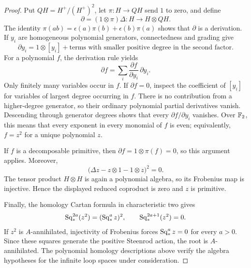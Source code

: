 \begin{proof}
Put $QH=H^+/(H^+)^2$, let $\pi:H\to QH$ send $1$ to zero,
and define
\[
 \partial=(1\otimes\pi)\Delta:H\longrightarrow H\otimes QH.
\]
The identity
$\pi(ab)=\epsilon(a)\pi(b)+\epsilon(b)\pi(a)$ shows that
$\partial$ is a derivation. If $y_i$ are homogeneous polynomial
generators, connectedness and grading give
\[
 \partial y_i=1\otimes[y_i]
  +\text{terms with smaller positive degree in the second factor}.
\]
For a polynomial $f$, the derivation rule yields
\[
 \partial f=\sum_i\frac{\partial f}{\partial y_i}\,\partial y_i.
\]
Only finitely many variables occur in $f$. If $\partial f=0$,
inspect the coefficient of $[y_i]$ for variables of largest
degree occurring in $f$. There is no contribution from a
higher-degree generator, so their ordinary polynomial partial
derivatives vanish. Descending through generator degrees shows
that every $\partial f/\partial y_i$ vanishes. Over $\mathbb F_2$, this
means that every exponent in every monomial of $f$ is even;
equivalently, $f=z^2$ for a unique polynomial $z$.

If $f$ is a decomposable primitive, then
$\partial f=1\otimes\pi(f)=0$, so this argument applies.
Moreover,
\[
 \bigl(\Delta z-z\otimes1-1\otimes z\bigr)^2=0.
\]
The tensor product $H\otimes H$ is again a polynomial algebra,
so its Frobenius map is injective. Hence the displayed reduced
coproduct is zero and $z$ is primitive.

Finally, the homology Cartan formula in characteristic two gives
\[
 \operatorname{Sq}_*^{2a}(z^2)=(\operatorname{Sq}_*^a z)^2,
 \qquad \operatorname{Sq}_*^{2a+1}(z^2)=0.
\]
If $z^2$ is $A$-annihilated, injectivity of Frobenius forces
$\operatorname{Sq}_*^a z=0$ for every $a>0$. Since these squares generate the
positive Steenrod action, the root is $A$-annihilated. The
polynomial homology descriptions above verify the algebra
hypotheses for the infinite loop spaces under consideration.
\end{proof}
